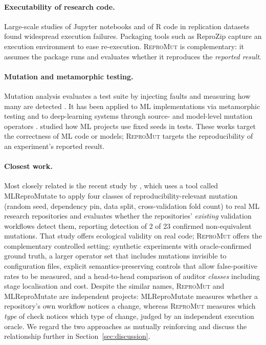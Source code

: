 \documentclass[11pt]{article}
\newcommand{\RM}{\textsc{ReproMut}}
\begin{document}
\paragraph{Executability of research code.} Large-scale studies of Jupyter notebooks \citep{pimentel2019jupyter} and of R code in replication datasets \citep{trisovic2022code} found widespread execution failures. Packaging tools such as ReproZip \citep{chirigati2016reprozip} capture an execution environment to ease re-execution. \RM{} is complementary: it assumes the package runs and evaluates whether it reproduces the \emph{reported result}.

\paragraph{Mutation and metamorphic testing.} Mutation analysis evaluates a test suite by injecting faults and measuring how many are detected \citep{jia2011mutation}. It has been applied to ML implementations via metamorphic testing \citep{xie2011metamorphic} and to deep-learning systems through source- and model-level mutation operators \citep{ma2018deepmutation}. \citet{dutta2022seed} studied how ML projects use fixed seeds in tests. These works target the correctness of ML code or models; \RM{} targets the reproducibility of an experiment's reported result.

\paragraph{Closest work.} Most closely related is the recent study by \citet{shulepov2026mutation}, which uses a tool called MLReproMutate to apply four classes of reproducibility-relevant mutation (random seed, dependency pin, data split, cross-validation fold count) to real ML research repositories and evaluates whether the repositories' \emph{existing} validation workflows detect them, reporting detection of 2 of 23 confirmed non-equivalent mutations. That study offers ecological validity on real code; \RM{} offers the complementary controlled setting: synthetic experiments with oracle-confirmed ground truth, a larger operator set that includes mutations invisible to configuration files, explicit semantics-preserving controls that allow false-positive rates to be measured, and a head-to-head comparison of auditor \emph{classes} including stage localisation and cost. Despite the similar names, \RM{} and MLReproMutate are independent projects: MLReproMutate measures whether a repository's own workflow notices a change, whereas \RM{} measures which \emph{type} of check notices which type of change, judged by an independent execution oracle. We regard the two approaches as mutually reinforcing and discuss the relationship further in Section~\ref{sec:discussion}.
\end{document}
